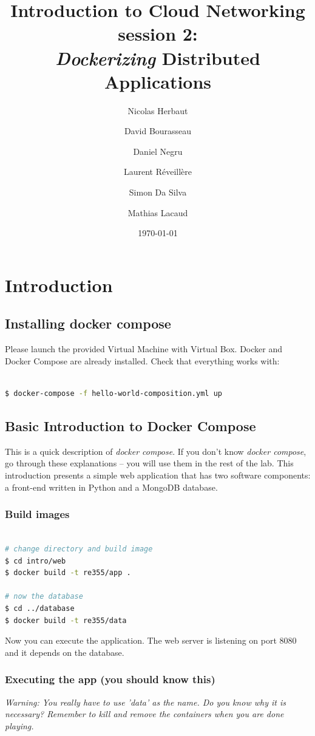 \documentclass[a4paper,11pt]{exam}
\date{\today}
\title{Introduction to Cloud Networking session 2: \\
\textit{Dockerizing} Distributed Applications}
\author{Nicolas Herbaut  \and David Bourasseau \and Daniel Negru \and Laurent Réveillère \and Simon Da Silva \and Mathias Lacaud}
\begin{document}
	
		
	
\maketitle


\section{Introduction}
\subsection{Installing docker compose}
Please launch the provided Virtual Machine with Virtual Box. Docker and Docker Compose are already installed. Check that everything works with:

\begin{lstlisting}[frame=single,language={sh}]  % Start your code-block

$ docker-compose -f hello-world-composition.yml up
\end{lstlisting}

\subsection{Basic Introduction to Docker Compose}

This is a quick description of \textit{docker compose}. If you don't know \textit{docker compose}, go through these explanations -- you will use them in the rest of the lab.
This introduction presents a simple web application that has two software components: a front-end written in Python and a MongoDB database.

\subsubsection*{Build images}
\begin{lstlisting}[frame=single,language={sh}]  % Start your code-block

# change directory and build image
$ cd intro/web
$ docker build -t re355/app .

# now the database
$ cd ../database
$ docker build -t re355/data
\end{lstlisting}

Now you can execute the application. The web server is listening on port 8080 and it depends on the database.

\subsubsection*{Executing the app (you should know this)}
\textit{Warning: You really have to use 'data' as the name. Do you know why it is necessary? Remember to kill and remove the containers when you are done playing.}
\end{document}

